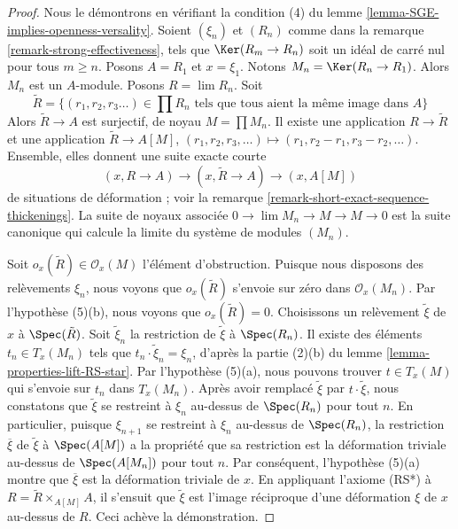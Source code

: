 \begin{proof}
Nous le démontrons en vérifiant la condition (4) du lemme
\ref{lemma-SGE-implies-openness-versality}. Soient $(\xi_n)$ et $(R_n)$ comme
dans la remarque \ref{remark-strong-effectiveness}, tels que
$\Ker(R_m \to R_n)$ soit un idéal de carré nul pour tous $m \geq n$. Posons
$A = R_1$ et $x = \xi_1$. Notons $M_n = \Ker(R_n \to R_1)$. Alors $M_n$ est
un $A$-module. Posons $R = \lim R_n$. Soit
$$
\tilde R = \{(r_1, r_2, r_3 \ldots) \in \prod R_n
\text{ tels que tous aient la même image dans }A\}
$$
Alors $\tilde R \to A$ est surjectif, de noyau $M = \prod M_n$. Il existe une
application $R \to \tilde R$ et une application $\tilde R \to A[M]$,
$(r_1, r_2, r_3, \ldots) \mapsto
(r_1, r_2 - r_1, r_3 - r_2, \ldots)$. Ensemble, elles donnent une suite
exacte courte
$$
(x, R \to A) \to (x, \tilde R \to A) \to (x, A[M])
$$
de situations de déformation ; voir la remarque
\ref{remark-short-exact-sequence-thickenings}. La suite de noyaux associée
$0 \to \lim M_n \to M \to M \to 0$ est la suite canonique qui calcule la
limite du système de modules $(M_n)$.

\medskip\noindent
Soit $o_x(\tilde R) \in \mathcal{O}_x(M)$ l'élément d'obstruction. Puisque nous
disposons des relèvements $\xi_n$, nous voyons que $o_x(\tilde R)$ s'envoie
sur zéro dans $\mathcal{O}_x(M_n)$. Par l'hypothèse (5)(b), nous voyons que
$o_x(\tilde R) = 0$. Choisissons un relèvement $\tilde \xi$ de $x$ à
$\Spec(\tilde R)$. Soit $\tilde \xi_n$ la restriction de $\tilde \xi$ à
$\Spec(R_n)$. Il existe des éléments $t_n \in T_x(M_n)$ tels que
$t_n \cdot \tilde \xi_n = \xi_n$, d'après la partie (2)(b) du lemme
\ref{lemma-properties-lift-RS-star}. Par l'hypothèse (5)(a), nous pouvons
trouver $t \in T_x(M)$ qui s'envoie sur $t_n$ dans $T_x(M_n)$. Après avoir
remplacé $\tilde \xi$ par $t \cdot \tilde \xi$, nous constatons que
$\tilde \xi$ se restreint à $\xi_n$ au-dessus de $\Spec(R_n)$ pour tout $n$.
En particulier, puisque $\xi_{n + 1}$ se restreint à $\xi_n$ au-dessus de
$\Spec(R_n)$, la restriction $\overline{\xi}$ de $\tilde \xi$ à
$\Spec(A[M])$ a la propriété que sa restriction est la déformation triviale
au-dessus de $\Spec(A[M_n])$ pour tout $n$. Par conséquent, l'hypothèse (5)(a)
montre que $\overline{\xi}$ est la déformation triviale de $x$. En appliquant
l'axiome (RS*) à $R = \tilde R \times_{A[M]} A$, il s'ensuit que
$\tilde \xi$ est l'image réciproque d'une déformation $\xi$ de $x$ au-dessus
de $R$. Ceci achève la démonstration.
\end{proof}

